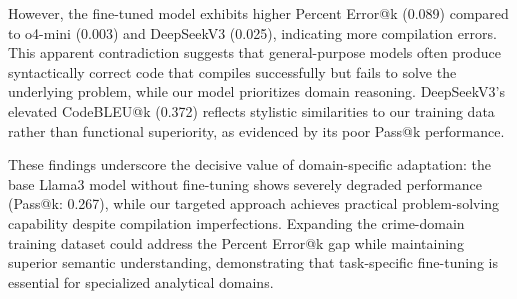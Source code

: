 However, the fine-tuned model exhibits higher Percent Error@k (0.089) compared to o4-mini (0.003) and DeepSeekV3 (0.025), indicating more compilation errors. This apparent contradiction suggests that general-purpose models often produce syntactically correct code that compiles successfully but fails to solve the underlying problem, while our model prioritizes domain reasoning. DeepSeekV3's elevated CodeBLEU@k (0.372) reflects stylistic similarities to our training data rather than functional superiority, as evidenced by its poor Pass@k performance.

These findings underscore the decisive value of domain-specific adaptation: the base Llama3 model without fine-tuning shows severely degraded performance (Pass@k: 0.267), while our targeted approach achieves practical problem-solving capability despite compilation imperfections. Expanding the crime-domain training dataset could address the Percent Error@k gap while maintaining superior semantic understanding, demonstrating that task-specific fine-tuning is essential for specialized analytical domains.




